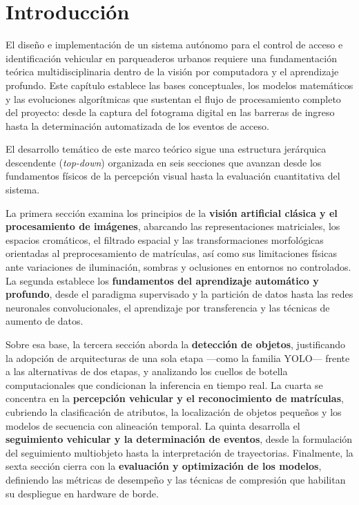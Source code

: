 \section{Introducción}

El diseño e implementación de un sistema autónomo para el control de acceso e
identificación vehicular en parqueaderos urbanos requiere una fundamentación 
teórica multidisciplinaria dentro de la visión por computadora y el aprendizaje
profundo. Este capítulo establece las bases conceptuales, los modelos
matemáticos y las evoluciones algorítmicas que sustentan el flujo de
procesamiento completo del proyecto: desde la captura del fotograma digital en
las barreras de ingreso hasta la determinación automatizada de los eventos de
acceso.

El desarrollo temático de este marco teórico sigue una estructura jerárquica
descendente (\textit{top-down}) organizada en seis secciones que avanzan desde
los fundamentos físicos de la percepción visual hasta la evaluación cuantitativa
del sistema.

La primera sección examina los principios de la \textbf{visión artificial clásica
y el procesamiento de imágenes}, abarcando las representaciones matriciales, los
espacios cromáticos, el filtrado espacial y las transformaciones morfológicas
orientadas al preprocesamiento de matrículas, así como sus limitaciones físicas
ante variaciones de iluminación, sombras y oclusiones en entornos no
controlados. La segunda establece los \textbf{fundamentos del aprendizaje
automático y profundo}, desde el paradigma supervisado y la partición de datos
hasta las redes neuronales convolucionales, el aprendizaje por transferencia y
las técnicas de aumento de datos.

Sobre esa base, la tercera sección aborda la \textbf{detección de objetos},
justificando la adopción de arquitecturas de una sola etapa ---como la familia
YOLO--- frente a las alternativas de dos etapas, y analizando los cuellos de
botella computacionales que condicionan la inferencia en tiempo real. La cuarta
se concentra en la \textbf{percepción vehicular y el reconocimiento de
matrículas}, cubriendo la clasificación de atributos, la localización de objetos
pequeños y los modelos de secuencia con alineación temporal. La quinta desarrolla
el \textbf{seguimiento vehicular y la determinación de eventos}, desde la
formulación del seguimiento multiobjeto hasta la interpretación de trayectorias.
Finalmente, la sexta sección cierra con la \textbf{evaluación y optimización de
los modelos}, definiendo las métricas de desempeño y las técnicas de compresión
que habilitan su despliegue en hardware de borde.
